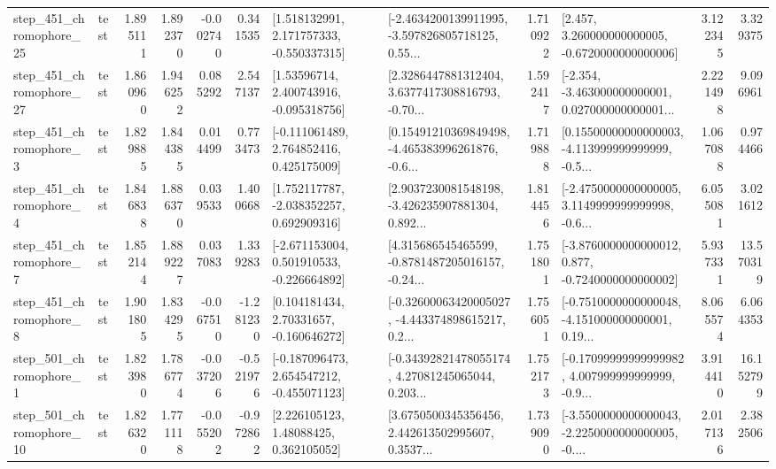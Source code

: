 \begin{tabular}{llrrrrllrlrr}
  step\_451\_chromophore\_25 &      test &      1.895111 &    1.892370 &     -0.002740 &  0.341535 &    [1.518132991, 2.171757333, -0.550337315] &  [-2.4634200139911995, -3.597826805718125, 0.55... &       1.710922 &    [2.457, 3.260000000000005, -0.6720000000000006] &            3.122345 &          3.329375 \\
  step\_451\_chromophore\_27 &      test &      1.860960 &    1.946252 &      0.085292 &  2.547137 &     [1.53596714, 2.400743916, -0.095318756] &  [2.3286447881312404, 3.6377417308816793, -0.70... &       1.592417 &  [-2.354, -3.463000000000001, 0.027000000000001... &            2.221498 &          9.096961 \\
   step\_451\_chromophore\_3 &      test &      1.829885 &    1.844385 &      0.014499 &  0.773473 &    [-0.111061489, 2.764852416, 0.425175009] &  [0.15491210369849498, -4.465383996261876, -0.6... &       1.719888 &  [0.15500000000000003, -4.113999999999999, -0.5... &            1.067088 &          0.974466 \\
   step\_451\_chromophore\_4 &      test &      1.846838 &    1.886370 &      0.039533 &  1.400668 &    [1.752117787, -2.038352257, 0.692909316] &  [2.9037230081548198, -3.426235907881304, 0.892... &       1.814456 &  [-2.4750000000000005, 3.1149999999999998, -0.6... &            6.055081 &          3.021612 \\
   step\_451\_chromophore\_7 &      test &      1.852144 &    1.889227 &      0.037083 &  1.339283 &   [-2.671153004, 0.501910533, -0.226664892] &  [4.315686545465599, -0.8781487205016157, -0.24... &       1.751801 &  [-3.8760000000000012, 0.877, -0.7240000000000002] &            5.937331 &         13.570319 \\
   step\_451\_chromophore\_8 &      test &      1.901805 &    1.834295 &     -0.067510 & -1.281230 &     [0.104181434, 2.70331657, -0.160646272] &  [-0.32600063420005027, -4.443374898615217, 0.2... &       1.756051 &  [-0.7510000000000048, -4.151000000000001, 0.19... &            8.065574 &          6.064353 \\
   step\_501\_chromophore\_1 &      test &      1.823980 &    1.786774 &     -0.037206 & -0.521976 &   [-0.187096473, 2.654547212, -0.455071123] &  [-0.34392821478055174, 4.27081245065044, 0.203... &       1.752173 &  [-0.17099999999999982, 4.007999999999999, -0.9... &            3.914410 &         16.152799 \\
  step\_501\_chromophore\_10 &      test &      1.826320 &    1.771118 &     -0.055202 & -0.972862 &      [2.226105123, 1.48088425, 0.362105052] &  [3.6750500345356456, 2.442613502995607, 0.3537... &       1.739090 &  [-3.5500000000000043, -2.2250000000000005, -0.... &            2.017136 &          2.382506 \\

\end{tabular}
